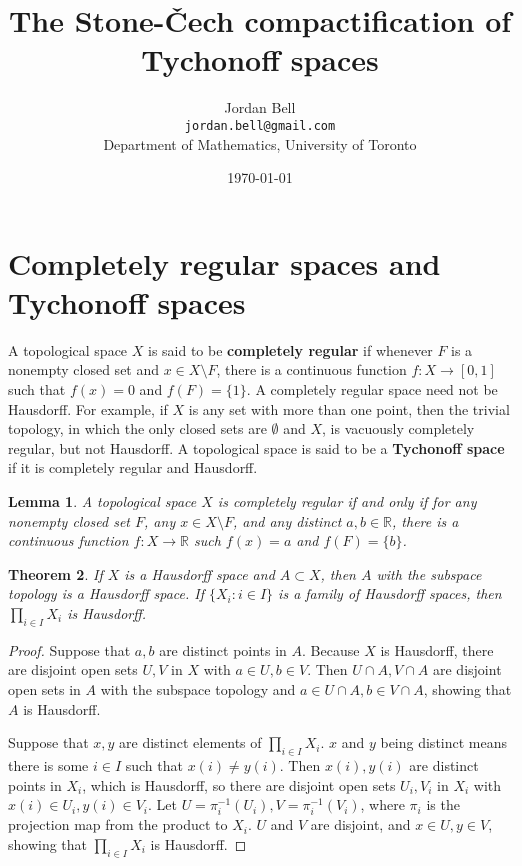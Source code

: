 \documentclass{article}
\newtheorem{theorem}{Theorem}
\newtheorem{lemma}[theorem]{Lemma}
\theoremstyle{definition}
\begin{document}
\title{The Stone-\v{C}ech compactification of Tychonoff spaces}
\author{Jordan Bell\\ \texttt{jordan.bell@gmail.com}\\Department of Mathematics, University of Toronto}
\date{\today}

\maketitle

\section{Completely regular spaces and Tychonoff spaces}
\label{introduction}
A topological space $X$ is said to be \textbf{completely regular} if whenever
$F$ is a nonempty closed set and $x \in X \setminus F$,
there is a continuous function $f:X \to [0,1]$ such that $f(x)=0$ and $f(F) = \{1\}$. 
A completely regular space need not be Hausdorff. For example, if $X$ is any set with more than one point,
then the trivial topology, in which the only closed sets are $\emptyset$ and $X$, is vacuously completely regular, but not Hausdorff.
A topological space is said to be a \textbf{Tychonoff space} if it is completely regular and Hausdorff. 

\begin{lemma}
A topological space $X$ is completely regular if and only if for any 
nonempty closed set $F$, any $x \in X \setminus F$, and
any
distinct $a,b \in \mathbb{R}$, there is a continuous
function $f:X \to \mathbb{R}$ such $f(x)=a$ and $f(F)=\{b\}$.
\label{equivalentcr}
\end{lemma}


\begin{theorem}
If $X$ is a Hausdorff space and $A \subset X$, then $A$ with the subspace topology is a Hausdorff space. If $\{X_i:i \in I\}$
is a family of Hausdorff spaces, then $\prod_{i \in I} X_i$ is Hausdorff.
\end{theorem}
\begin{proof}
Suppose that $a,b$ are distinct points in $A$. Because $X$ is Hausdorff, there are disjoint open sets $U,V$ in $X$ with $a \in U, b \in V$. 
Then $U \cap A, V \cap A$ are disjoint open sets in $A$ with the subspace topology  and $a \in U \cap A, b \in V \cap A$, showing that $A$ is Hausdorff.

Suppose that $x,y$ are distinct elements of $\prod_{i \in I} X_i$. $x$ and $y$ being distinct means there is some $i \in I$ such that
$x(i) \neq y(i)$. Then $x(i), y(i)$ are distinct points in $X_i$, which is Hausdorff, so there are disjoint open sets $U_i, V_i$ in $X_i$
with $x(i) \in U_i, y(i) \in V_i$. Let $U=\pi_i^{-1}(U_i), V=\pi_i^{-1}(V_i)$, where $\pi_i$ is the projection map
from the product to $X_i$. $U$ and $V$ are disjoint, and $x \in U, y \in V$, showing that $\prod_{i \in I} X_i$ is Hausdorff.
\end{proof}
\end{document}

